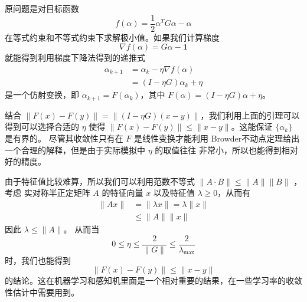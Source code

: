 \begin{remark}
原问题是对目标函数
\begin{equation}
f(\alpha) = \frac{1}{2} \alpha^T G \alpha -\alpha
\end{equation}
在等式约束和不等式约束下求解极小值。如果我们计算梯度
\begin{equation}
\nabla f(\alpha) = G\alpha - \mathbf{1}
\end{equation}
就能得到利用梯度下降法得到的递推式
\begin{equation}
\begin{aligned}
\alpha_{k+1} &= \alpha_k - \eta \nabla f(\alpha) \\
             &= (I - \eta G) \alpha_k  + \eta
\end{aligned}
\end{equation}
是一个仿射变换，即 $\alpha_{k+1} = F(\alpha_k)$，其中 $F(\alpha) = (I-\eta G) \alpha +\eta$。

结合 $\|F(x) - F(y)\| = \|(I-\eta G)(x-y)\|$，我们利用上面的引理可以得到可以选择合适的 $\eta$ 使得
$\|F(x)-F(y)\| \leqslant \|x-y\|$。这能保证 $\{ \alpha_k \}$ 是有界的。
尽管其收敛性只有在 $F$ 是线性变换才能利用 Browder不动点定理给出一个合理的解释，但是由于实际模拟中 $\eta$ 的取值往往
非常小，所以也能得到相对好的精度。
\end{remark}

\begin{remark}
由于特征值比较难算，所以我们可以利用范数不等式 $\|A\cdot B \| \leqslant \|A\|\|B\|$ ，考虑
实对称半正定矩阵 $A$ 的特征向量 $x$ 以及特征值 $\lambda \geqslant 0$，从而有
\begin{equation}
\begin{aligned}
\|Ax\| &= \|\lambda x\| = \lambda \|x\| \\
 &\leqslant \|A\|\|x\|
\end{aligned}
\end{equation}
因此 $\lambda \leqslant \|A\|$。
从而当
\begin{equation}
0 \leqslant \eta \leqslant \frac{2}{\|G\|} \leqslant  \frac{2}{\lambda_{\max}}
\end{equation}
时，我们也能得到
\begin{equation}
\|F(x) - F(y)\| \le \|x - y\|
\end{equation}
的结论。这在机器学习和感知机里面是一个相对重要的结果，在一些学习率的收敛性估计中需要用到。
\end{remark}